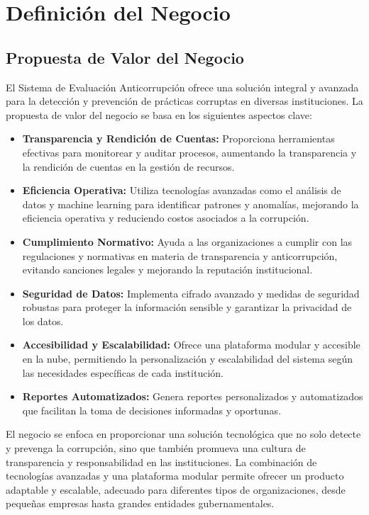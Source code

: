 \documentclass[a4paper,12pt]{article}
\begin{document}
\section{Definición del Negocio}
\subsection{Propuesta de Valor del Negocio}
El Sistema de Evaluación Anticorrupción ofrece una solución integral y avanzada para la detección y prevención de prácticas corruptas en diversas instituciones. La propuesta de valor del negocio se basa en los siguientes aspectos clave:

\begin{itemize}
    \item \textbf{Transparencia y Rendición de Cuentas:} Proporciona herramientas efectivas para monitorear y auditar procesos, aumentando la transparencia y la rendición de cuentas en la gestión de recursos.
    \item \textbf{Eficiencia Operativa:} Utiliza tecnologías avanzadas como el análisis de datos y machine learning para identificar patrones y anomalías, mejorando la eficiencia operativa y reduciendo costos asociados a la corrupción.
    \item \textbf{Cumplimiento Normativo:} Ayuda a las organizaciones a cumplir con las regulaciones y normativas en materia de transparencia y anticorrupción, evitando sanciones legales y mejorando la reputación institucional.
    \item \textbf{Seguridad de Datos:} Implementa cifrado avanzado y medidas de seguridad robustas para proteger la información sensible y garantizar la privacidad de los datos.
    \item \textbf{Accesibilidad y Escalabilidad:} Ofrece una plataforma modular y accesible en la nube, permitiendo la personalización y escalabilidad del sistema según las necesidades específicas de cada institución.
    \item \textbf{Reportes Automatizados:} Genera reportes personalizados y automatizados que facilitan la toma de decisiones informadas y oportunas.
\end{itemize}

El negocio se enfoca en proporcionar una solución tecnológica que no solo detecte y prevenga la corrupción, sino que también promueva una cultura de transparencia y responsabilidad en las instituciones. La combinación de tecnologías avanzadas y una plataforma modular permite ofrecer un producto adaptable y escalable, adecuado para diferentes tipos de organizaciones, desde pequeñas empresas hasta grandes entidades gubernamentales.
\end{document}
